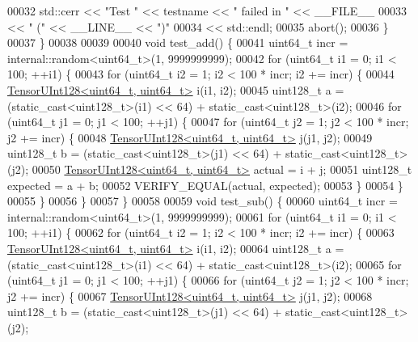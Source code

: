 \begin{DoxyCode}
00032     std::cerr << \textcolor{stringliteral}{"Test "} << testname << \textcolor{stringliteral}{" failed in "} << \_\_FILE\_\_
00033               << \textcolor{stringliteral}{" ("} << \_\_LINE\_\_ << \textcolor{stringliteral}{")"}
00034               << std::endl;
00035     abort();
00036   \}
00037 \}
00038 
00039 
00040 \textcolor{keywordtype}{void} test\_add() \{
00041   uint64\_t incr = internal::random<uint64\_t>(1, 9999999999);
00042   \textcolor{keywordflow}{for} (uint64\_t i1 = 0; i1 < 100; ++i1) \{
00043     \textcolor{keywordflow}{for} (uint64\_t i2 = 1; i2 < 100 * incr; i2 += incr) \{
00044       \hyperlink{struct_eigen_1_1internal_1_1_tensor_u_int128}{TensorUInt128<uint64\_t, uint64\_t>} i(i1, i2);
00045       uint128\_t a = (\textcolor{keyword}{static\_cast<}uint128\_t\textcolor{keyword}{>}(i1) << 64) + \textcolor{keyword}{static\_cast<}uint128\_t\textcolor{keyword}{>}(i2);
00046       \textcolor{keywordflow}{for} (uint64\_t j1 = 0; j1 < 100; ++j1) \{
00047         \textcolor{keywordflow}{for} (uint64\_t j2 = 1; j2 < 100 * incr; j2 += incr) \{
00048           \hyperlink{struct_eigen_1_1internal_1_1_tensor_u_int128}{TensorUInt128<uint64\_t, uint64\_t>} j(j1, j2);
00049           uint128\_t b = (\textcolor{keyword}{static\_cast<}uint128\_t\textcolor{keyword}{>}(j1) << 64) + \textcolor{keyword}{static\_cast<}uint128\_t\textcolor{keyword}{>}(j2);
00050           \hyperlink{struct_eigen_1_1internal_1_1_tensor_u_int128}{TensorUInt128<uint64\_t, uint64\_t>} actual = i + j;
00051           uint128\_t expected = a + b;
00052           VERIFY\_EQUAL(actual, expected);
00053         \}
00054       \}
00055     \}
00056   \}
00057 \}
00058 
00059 \textcolor{keywordtype}{void} test\_sub() \{
00060   uint64\_t incr = internal::random<uint64\_t>(1, 9999999999);
00061   \textcolor{keywordflow}{for} (uint64\_t i1 = 0; i1 < 100; ++i1) \{
00062     \textcolor{keywordflow}{for} (uint64\_t i2 = 1; i2 < 100 * incr; i2 += incr) \{
00063       \hyperlink{struct_eigen_1_1internal_1_1_tensor_u_int128}{TensorUInt128<uint64\_t, uint64\_t>} i(i1, i2);
00064       uint128\_t a = (\textcolor{keyword}{static\_cast<}uint128\_t\textcolor{keyword}{>}(i1) << 64) + \textcolor{keyword}{static\_cast<}uint128\_t\textcolor{keyword}{>}(i2);
00065       \textcolor{keywordflow}{for} (uint64\_t j1 = 0; j1 < 100; ++j1) \{
00066         \textcolor{keywordflow}{for} (uint64\_t j2 = 1; j2 < 100 * incr; j2 += incr) \{
00067           \hyperlink{struct_eigen_1_1internal_1_1_tensor_u_int128}{TensorUInt128<uint64\_t, uint64\_t>} j(j1, j2);
00068           uint128\_t b = (\textcolor{keyword}{static\_cast<}uint128\_t\textcolor{keyword}{>}(j1) << 64) + \textcolor{keyword}{static\_cast<}uint128\_t\textcolor{keyword}{>}(j2);

\end{DoxyCode}
